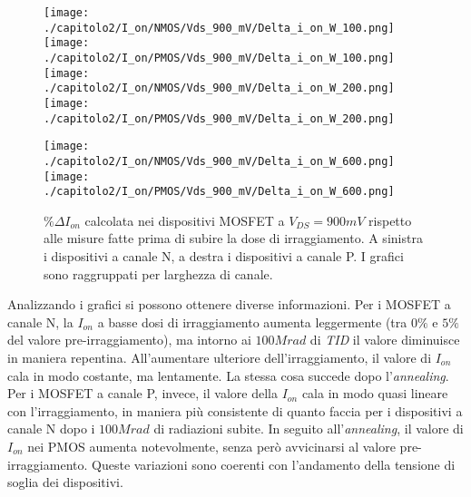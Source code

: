 \begin{figure}[h]
    \centering
    \texttt{[image: ./capitolo2/I\_on/NMOS/Vds\_900\_mV/Delta\_i\_on\_W\_100.png]}
    \texttt{[image: ./capitolo2/I\_on/PMOS/Vds\_900\_mV/Delta\_i\_on\_W\_100.png]}\\
    \vspace{0.2cm}
    \texttt{[image: ./capitolo2/I\_on/NMOS/Vds\_900\_mV/Delta\_i\_on\_W\_200.png]}
    \texttt{[image: ./capitolo2/I\_on/PMOS/Vds\_900\_mV/Delta\_i\_on\_W\_200.png]}\\
    \vspace{0.2cm}

    \texttt{[image: ./capitolo2/I\_on/NMOS/Vds\_900\_mV/Delta\_i\_on\_W\_600.png]}
    \texttt{[image: ./capitolo2/I\_on/PMOS/Vds\_900\_mV/Delta\_i\_on\_W\_600.png]}

    \caption[Dati $\% \Delta I_{on}$ a $V_{DS}=900mV$ ]{$\% \Delta I_{on}$ calcolata nei dispositivi MOSFET a $V_{DS} = 900mV$ rispetto alle misure fatte prima di subire la dose di irraggiamento. A sinistra i dispositivi a canale N, a destra i dispositivi a canale P. I grafici sono raggruppati per larghezza di canale.}
    \label{fig:delta_I_on_vds_900_mv}

\end{figure}

\vspace*{0.5cm}

Analizzando i grafici si possono ottenere diverse informazioni.
Per i MOSFET a canale N, la $I_{on}$ a basse dosi di irraggiamento aumenta leggermente (tra $0\%$ e $5\%$ del valore pre-irraggiamento), ma intorno ai $100 Mrad$ di \emph{TID} il valore diminuisce in maniera repentina. All'aumentare ulteriore dell'irraggiamento, il valore di $I_{on}$ cala in modo costante, ma lentamente. La stessa cosa succede dopo l'\emph{annealing}. Per i MOSFET a canale P, invece, il valore della $I_{on}$ cala in modo quasi lineare con l'irraggiamento, in maniera più consistente di quanto faccia per i dispositivi a canale N dopo i $100 Mrad$ di radiazioni subite. In seguito all'\emph{annealing}, il valore di $I_{on}$ nei PMOS aumenta notevolmente, senza però avvicinarsi al valore pre-irraggiamento. Queste variazioni sono coerenti con l'andamento della tensione di soglia dei dispositivi. 



